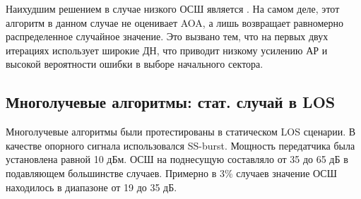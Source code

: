 Наихудшим решением в случае низкого ОСШ является \ACS{}. На самом деле, этот
алгоритм в данном случае не оценивает AOA, а лишь возвращает равномерно
распределенное случайное значение. Это вызвано тем, что \ACS{} на первых двух
итерациях использует широкие ДН, что приводит низкому усилению АР и высокой
вероятности ошибки в выборе начального сектора. 


\subsection{Многолучевые алгоритмы: стат. случай в LOS}

Многолучевые алгоритмы были протестированы в статическом LOS сценарии. В
качестве опорного сигнала использовался SS-burst.  Мощность передатчика была
установлена равной 10 дБм. ОСШ на поднесущую
составляло от 35 до 65 дБ в подавляющем большинстве случаев. Примерно в 3\%
случаев значение ОСШ находилось в диапазоне от 19 до 35 дБ.  

